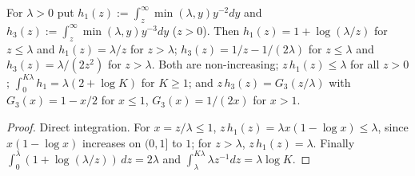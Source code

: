 \begin{lemma}\label{lem:Estar-int}
For $\lambda>0$ put $h_1(z):=\int_z^\infty\min(\lambda,y)y^{-2}dy$ and $h_3(z):=\int_z^\infty\min(\lambda,y)y^{-3}dy$ ($z>0$). Then
$h_1(z)=1+\log(\lambda/z)$ for $z\le\lambda$ and $h_1(z)=\lambda/z$ for $z>\lambda$; $h_3(z)=1/z-1/(2\lambda)$ for $z\le\lambda$ and
$h_3(z)=\lambda/(2z^2)$ for $z>\lambda$. Both are non-increasing; $z\,h_1(z)\le\lambda$ for all $z>0$;
$\int_0^{K\lambda}h_1=\lambda(2+\log K)$ for $K\ge1$; and $z\,h_3(z)=G_3(z/\lambda)$ with $G_3(x)=1-x/2$ for $x\le1$,
$G_3(x)=1/(2x)$ for $x>1$.
\end{lemma}
\begin{proof}
Direct integration. For $x=z/\lambda\le1$, $z\,h_1(z)=\lambda x(1-\log x)\le\lambda$, since $x(1-\log x)$ increases on $(0,1]$ to $1$;
for $z>\lambda$, $z\,h_1(z)=\lambda$. Finally $\int_0^\lambda(1+\log(\lambda/z))\,dz=2\lambda$ and
$\int_\lambda^{K\lambda}\lambda z^{-1}dz=\lambda\log K$.
\end{proof}

